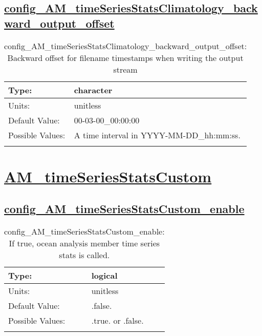 \subsection[config\_AM\_timeSeriesStatsClimatology\_backward\_output\_offset]{\hyperref[sec:nm_tab_AM_timeSeriesStatsClimatology]{config\_AM\_timeSeriesStatsClimatology\_backward\_output\_offset}}
\label{subsec:nm_sec_config_AM_timeSeriesStatsClimatology_backward_output_offset}
\begin{center}
\begin{longtable}{| p{2.0in} || p{4.0in} |}
    \hline
    Type: & character \\
    \hline
    Units: & \si{unitless} \\
    \hline
    Default Value: & 00-03-00\_00:00:00 \\
    \hline
    Possible Values: & A time interval in YYYY-MM-DD\_hh:mm:ss. \\
    \hline
    \caption{config\_AM\_timeSeriesStatsClimatology\_backward\_output\_offset: Backward offset for filename timestamps when writing the output stream}
\end{longtable}
\end{center}
\section[AM\_timeSeriesStatsCustom]{\hyperref[sec:nm_tab_AM_timeSeriesStatsCustom]{AM\_timeSeriesStatsCustom}}
\label{sec:nm_sec_AM_timeSeriesStatsCustom}
\subsection[config\_AM\_timeSeriesStatsCustom\_enable]{\hyperref[sec:nm_tab_AM_timeSeriesStatsCustom]{config\_AM\_timeSeriesStatsCustom\_enable}}
\label{subsec:nm_sec_config_AM_timeSeriesStatsCustom_enable}
\begin{center}
\begin{longtable}{| p{2.0in} || p{4.0in} |}
    \hline
    Type: & logical \\
    \hline
    Units: & \si{unitless} \\
    \hline
    Default Value: & .false. \\
    \hline
    Possible Values: & .true. or .false. \\
    \hline
    \caption{config\_AM\_timeSeriesStatsCustom\_enable: If true, ocean analysis member time series stats is called.}
\end{longtable}
\end{center}

